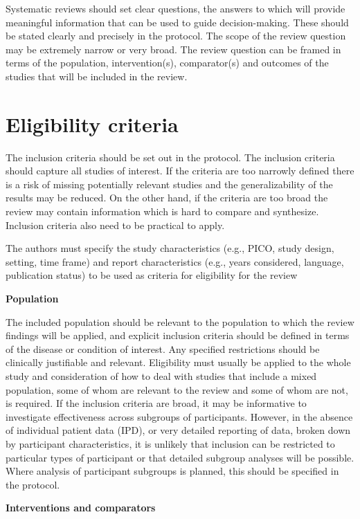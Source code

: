 \documentclass[
  11pt,
  a4paper,
  DIV=11,
  numbers=noendperiod]{scrreprt}
\begin{document}
Systematic reviews should set clear questions, the answers to which will
provide meaningful information that can be used to guide
decision-making. These should be stated clearly and precisely in the
protocol. The scope of the review question may be extremely narrow or
very broad. The review question can be framed in terms of the
population, intervention(s), comparator(s) and outcomes of the studies
that will be included in the review.

\section{Eligibility criteria}\label{eligibility-criteria}

The inclusion criteria should be set out in the protocol. The inclusion
criteria should capture all studies of interest. If the criteria are too
narrowly defined there is a risk of missing potentially relevant studies
and the generalizability of the results may be reduced. On the other
hand, if the criteria are too broad the review may contain information
which is hard to compare and synthesize. Inclusion criteria also need to
be practical to apply.

The authors must specify the study characteristics (e.g., PICO, study
design, setting, time frame) and report characteristics (e.g., years
considered, language, publication status) to be used as criteria for
eligibility for the review

\textbf{Population}

The included population should be relevant to the population to which
the review findings will be applied, and explicit inclusion criteria
should be defined in terms of the disease or condition of interest. Any
specified restrictions should be clinically justifiable and relevant.
Eligibility must usually be applied to the whole study and consideration
of how to deal with studies that include a mixed population, some of
whom are relevant to the review and some of whom are not, is required.
If the inclusion criteria are broad, it may be informative to
investigate effectiveness across subgroups of participants. However, in
the absence of individual patient data (IPD), or very detailed reporting
of data, broken down by participant characteristics, it is unlikely that
inclusion can be restricted to particular types of participant or that
detailed subgroup analyses will be possible. Where analysis of
participant subgroups is planned, this should be specified in the
protocol.

\textbf{Interventions and comparators}
\end{document}
